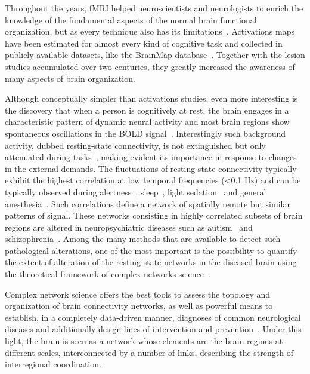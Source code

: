 Throughout the years, fMRI helped neuroscientists and neurologists to enrich the knowledge of the fundamental aspects of the normal brain functional organization, but as every technique also has its limitations~\cite{logothetis2008}. Activations maps have been estimated for almost every kind of cognitive task and collected in publicly available datasets, like the BrainMap database~\cite{fox2002}. Together with the lesion studies accumulated over two centuries, they greatly increased the awareness of many aspects of brain organization.

Although conceptually simpler than activations studies, even more interesting is the discovery that when a person is cognitively at rest, the brain engages in a characteristic pattern of dynamic neural activity and most brain regions show spontaneous oscillations in the BOLD signal~\cite{raichle2001,gusnard2001}. Interestingly such background activity, dubbed resting-state connectivity, is not extinguished but only attenuated during tasks~\cite{fransson2006}, making evident its importance in response to changes in the external demands.
The fluctuations of resting-state connectivity typically exhibit the highest correlation at low temporal frequencies (<0.1 Hz) and can be typically observed during alertness~\cite{fox2006}, sleep~\cite{horovitz2009}, light sedation~\cite{greicius2008} and general anesthesia~\cite{martuzzi2010}.
Such correlations define a network of spatially remote but similar patterns of signal. These networks consisting in highly correlated subsets of brain regions are altered in neuropsychiatric diseases such as autism~\cite{rudie2013} and schizophrenia~\cite{vandenheuvel2014}. 
Among the many methods that are available to detect such pathological alterations, one of the most important is the possibility to quantify the extent of alteration of the resting state networks in the diseased brain using the theoretical framework of complex networks science~\cite{sporns2000,sporns2002,sporns2004,bullmore2009,stam2014}.

Complex network science offers the best tools to assess the topology and organization of brain connectivity networks, as well as powerful means to establish, in a completely data-driven manner, diagnoses of common neurological diseases and additionally design lines of intervention and prevention~\cite{bullmore2009,stam2014,crossley2014}. Under this light, the brain is seen as a network whose elements are the brain regions at different scales, interconnected by a number of links, describing the strength of interregional coordination.

